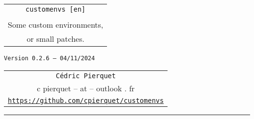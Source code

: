 \documentclass[english,11pt,a4paper]{article}
\def\TPversion{0.2.6}
\def\TPdate{04/11/2024}
\begin{document}
\pagestyle{fancy}

\thispagestyle{empty}

\begin{center}
	\begin{minipage}{0.75\linewidth}
	\begin{tcolorbox}[colframe=yellow,colback=yellow!15]
		\begin{center}
			\renewcommand\arraystretch{1.25}
			\begin{tabular}{c}
				{\Huge \texttt{customenvs [en]}}\\
				\\
				{\Large Some custom environments,} \\
				{\Large or small patches.} \\
			\end{tabular}
			\renewcommand\arraystretch{1}
			
			\medskip
			
			{\small \texttt{Version \TPversion{} -- \TPdate}}
		\end{center}
	\end{tcolorbox}
\end{minipage}
\end{center}

\vspace*{1mm}

\begin{center}
	\begin{tabular}{c}
	\texttt{Cédric Pierquet}\\
	{\ttfamily c pierquet -- at -- outlook . fr}\\
	\texttt{\url{https://github.com/cpierquet/customenvs}}
\end{tabular}
\end{center}

\vspace*{5mm}

%
%
%
%
%

\hrule


\hypertarget{matoc}{}

\tableofcontents

\vspace*{5mm}
\end{document}
